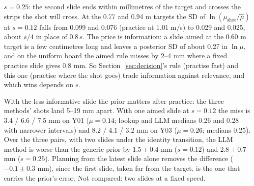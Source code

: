 \documentclass[10pt]{article}
\begin{document}
$s=0.25$: the second slide ends within millimetres of the target and crosses the strips the shot will cross.  At the 0.77
and 0.94 m targets the SD of $\ln(\mu_{\text{shot}}/\hat\mu)$ at $s=0.12$ falls from 0.099 and 0.076 (practice at 1.01 m/s)
to 0.029 and 0.025, about $s/4$ in place of $0.8\,s$.  The price is information: a slide aimed at the 0.60 m target is a
few centimetres long and leaves a posterior SD of about 0.27 in $\ln\mu$, and on the uniform board the aimed rule misses
by 2--4 mm where a fixed practice slide gives 0.8 mm.  So Section~\ref{sec:decision}'s rule (practise fast) and this one
(practise where the shot goes) trade information against relevance, and which wins depends on $s$.

With the less informative slide the prior matters after practice: the three methods' shots land 5--19 mm apart.  With one
aimed slide at $s=0.12$ the miss is 3.4 / 6.6 / 7.5 mm on Y01 ($\mu=0.14$; lookup and LLM medians 0.26 and 0.28 with
narrower intervals) and 8.2 / 4.1 / 3.2 mm on Y03 ($\mu=0.26$; medians 0.25).  Over the three pairs, with two slides under
the identity transition, the LLM method is worse than the generic prior by $1.5\pm0.4$ mm ($s=0.12$) and $2.8\pm0.7$ mm
($s=0.25$).  Planning from the latest slide alone removes the difference ($-0.1\pm0.3$ mm), since the first slide, taken
far from the target, is the one that carries the prior's error.  Not compared: two slides at a fixed speed.
\end{document}
